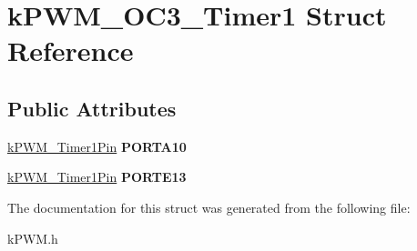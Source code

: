 \hypertarget{structkPWM__OC3__Timer1}{}\section{k\+P\+W\+M\+\_\+\+O\+C3\+\_\+\+Timer1 Struct Reference}
\label{structkPWM__OC3__Timer1}
\subsection*{Public Attributes}
\begin{DoxyCompactItemize}
\item 
\hyperlink{structkPWM__Timer1Pin}{k\+P\+W\+M\+\_\+\+Timer1\+Pin} {\bfseries P\+O\+R\+T\+A10}\hypertarget{structkPWM__OC3__Timer1_a71e9afc19cfdf2eb66570d72c86d0fa3}{}\label{structkPWM__OC3__Timer1_a71e9afc19cfdf2eb66570d72c86d0fa3}

\item 
\hyperlink{structkPWM__Timer1Pin}{k\+P\+W\+M\+\_\+\+Timer1\+Pin} {\bfseries P\+O\+R\+T\+E13}\hypertarget{structkPWM__OC3__Timer1_a4f96044322a8b1251b4465024a5cc6bc}{}\label{structkPWM__OC3__Timer1_a4f96044322a8b1251b4465024a5cc6bc}

\end{DoxyCompactItemize}


The documentation for this struct was generated from the following file\+:\begin{DoxyCompactItemize}
\item 
k\+P\+W\+M.\+h\end{DoxyCompactItemize}
